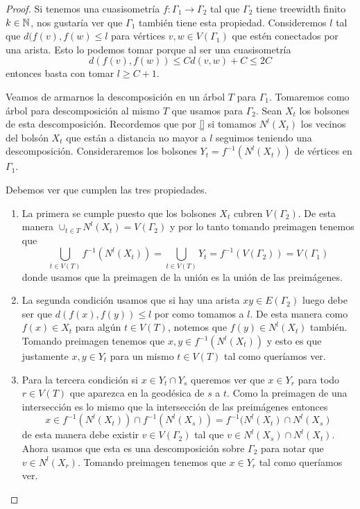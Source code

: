 \documentclass[tesis.tex]{subfiles}
\begin{document}
\begin{proof}
	Si tenemos una cuasisometría $f:\Gamma_1 \to \Gamma_2$ tal que $\Gamma_2$ tiene treewidth finito $k \in \mathbb N$, nos gustaría ver que $\Gamma_1$ también tiene esta propiedad.
	Consideremos $l$ tal que $d(f(v),f(w) \le l$ para vértices $v,w \in V(\Gamma_1)$ que estén conectados por una arista.
	Esto lo podemos tomar porque al ser una cuasisometría 
	\[
	d(f(v),f(w)) \le C d(v,w) + C  \le 2C
	\]
	entonces basta con tomar $l \ge C+1$.
	
	Veamos de armarnos la descomposición en un árbol $T$ para $\Gamma_1$.	
	Tomaremos como árbol para descomposición al mismo $T$ que usamos para $\Gamma_2$.
	Sean $X_t$ los bolsones de esta descomposición. 
	Recordemos que por \ref{} si tomamos $N^l(X_t)$ los vecinos del bolsón $X_t$ que están a distancia no mayor a $l$ seguimos teniendo una descomposición.  
	Consideraremos los bolsones $Y_t = f^{-1}(N^l(X_t))$ de vértices en $\Gamma_1$. 
	
	Debemos ver que cumplen las tres propiedades.
	
	\begin{enumerate}
		\item La primera se cumple puesto que los bolsones $X_t$ cubren $V(\Gamma_2)$. 
		De esta manera $\cup_{t \in T} N^l(X_t) = V(\Gamma_2)$ y por lo tanto tomando preimagen tenemos que
		\[
		\bigcup_{t \in V(T)} f^{-1} (N^l (X_t)) = \bigcup_{t \in V(T)} Y_t = f^{-1} (V(\Gamma_2)) = V(\Gamma_1)
		\] 
		donde usamos que la preimagen de la unión es la unión de las preimágenes.
		\item La segunda condición usamos que si hay una arista $xy \in E(\Gamma_2)$ luego debe ser que $d(f(x),f(y)) \le l$ por como tomamos a $l$.
		De esta manera como $f(x) \in X_t$ para algún $t \in V(T)$, notemos que $f(y) \in N^l(X_t)$ también. 
		Tomando preimagen tenemos que $x,y \in f^{-1}(N^l(X_t))$ y esto es que justamente $x,y \in Y_t$ para un mismo $t \in V(T)$ tal como queríamos ver.		
		\item Para la tercera condición si $x \in Y_t \cap Y_s$ queremos ver que $x \in Y_r$ para todo $r \in V(T)$ que aparezca en la geodésica de $s$ a $t$.
		Como la preimagen de una intersección es lo mismo que la intersección de las preimágenes entonces 
		\[
		x \in f^{-1}(N^l(X_t)) \cap f^{-1}(N^l(X_s)) = f^{-1}(N^l(X_t) \cap N^l (X_s)
		\]
		de esta manera debe existir $v \in V(\Gamma_2)$ tal que $v \in N^l(X_s) \cap N^l(X_t)$.
		Ahora usamos que esta es una descomposición sobre $\Gamma_2$ para notar que $v \in N^l(X_r)$.
		Tomando preimagen tenemos que $x \in Y_r$ tal como queríamos ver.
	\end{enumerate}
	

\end{proof}
\end{document}

